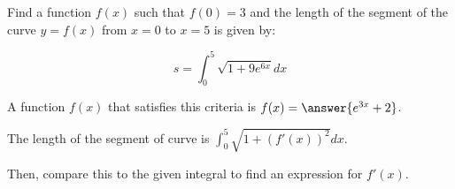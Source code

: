 \documentclass{ximera}
\author{Jim Talamo}
\begin{document}
\begin{exercise}

Find a function $f(x)$ such that $f(0)=3$ and the length of the segment of the curve $y=f(x)$ from $x=0$ to $x=5$ is given by:

\[
s= \int_0^5 \sqrt{1+9e^{6x}} dx
\]

A function $f(x)$ that satisfies this criteria is $f(x) = \answer{e^{3x}+2}$.

\begin{hint}
The length of the segment of curve is $\int_0^5 \sqrt{1+(f'(x))^2} dx$.

Then, compare this to the given integral to find an expression for $f'(x)$.
\end{hint}

\end{exercise}
\end{document}
